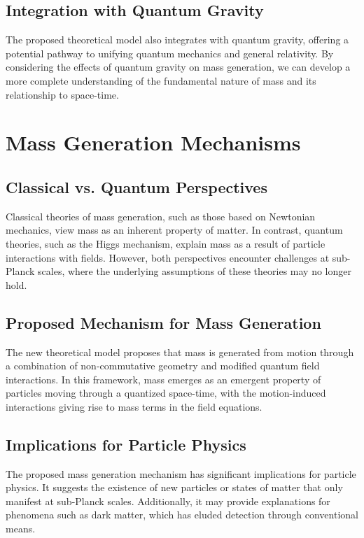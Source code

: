 \documentclass{article}
\begin{document}
\subsection{Integration with Quantum Gravity}
The proposed theoretical model also integrates with quantum gravity, offering a potential pathway to unifying quantum mechanics and general relativity. By considering the effects of quantum gravity on mass generation, we can develop a more complete understanding of the fundamental nature of mass and its relationship to space-time.

\section{Mass Generation Mechanisms}

\subsection{Classical vs. Quantum Perspectives}
Classical theories of mass generation, such as those based on Newtonian mechanics, view mass as an inherent property of matter. In contrast, quantum theories, such as the Higgs mechanism, explain mass as a result of particle interactions with fields. However, both perspectives encounter challenges at sub-Planck scales, where the underlying assumptions of these theories may no longer hold.

\subsection{Proposed Mechanism for Mass Generation}
The new theoretical model proposes that mass is generated from motion through a combination of non-commutative geometry and modified quantum field interactions. In this framework, mass emerges as an emergent property of particles moving through a quantized space-time, with the motion-induced interactions giving rise to mass terms in the field equations.

\subsection{Implications for Particle Physics}
The proposed mass generation mechanism has significant implications for particle physics. It suggests the existence of new particles or states of matter that only manifest at sub-Planck scales. Additionally, it may provide explanations for phenomena such as dark matter, which has eluded detection through conventional means.
\end{document}
